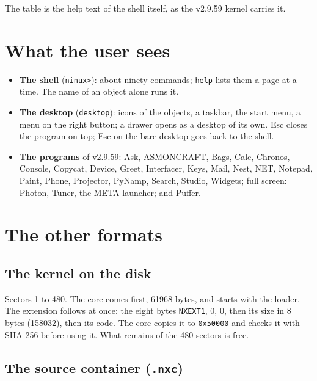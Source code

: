 \documentclass[11pt,a4paper]{article}
\newcommand{\cmd}[1]{\texttt{#1}}
\begin{document}
\noindent The table is the help text of the shell itself, as the v2.9.59 kernel carries it.



\section{What the user sees}

\begin{itemize}
\item \textbf{The shell} (\texttt{ninux>}): about ninety commands; \cmd{help} lists them a page
      at a time. The name of an object alone runs it.
\item \textbf{The desktop} (\cmd{desktop}): icons of the objects, a taskbar, the start menu, a menu
      on the right button; a drawer opens as a desktop of its own. Esc closes the program on top;
      Esc on the bare desktop goes back to the shell.
\item \textbf{The programs} of v2.9.59: Ask, ASMONCRAFT, Bags, Calc, Chronos, Console, Copycat,
      Device, Greet, Interfacer, Keys, Mail, Nest, NET, Notepad, Paint, Phone, Projector, PyNamp,
      Search, Studio, Widgets; full screen: Photon, Tuner, the META launcher; and Puffer.
\end{itemize}

\section{The other formats}

\subsection{The kernel on the disk}

Sectors 1 to 480. The core comes first, 61968 bytes, and starts with the loader. The extension
follows at once: the eight bytes \texttt{NXEXT1}, 0, 0, then its size in 8 bytes (158032), then its
code. The core copies it to \texttt{0x50000} and checks it with SHA-256 before using it. What
remains of the 480 sectors is free.

\subsection{The source container (\texttt{.nxc})}
\end{document}
